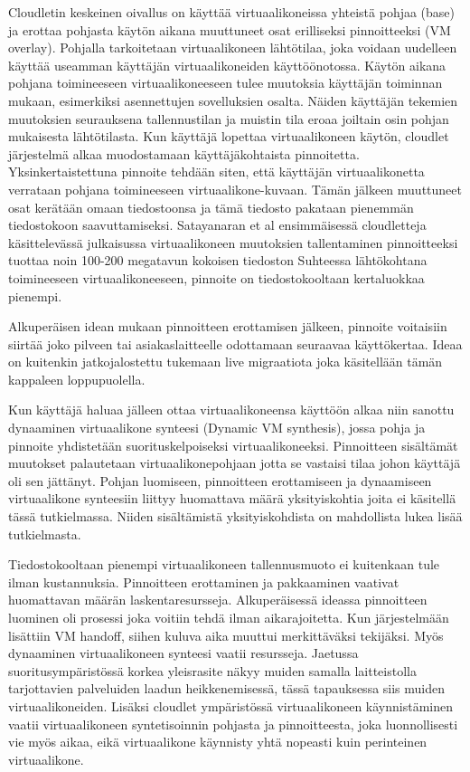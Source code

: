 Cloudletin keskeinen oivallus on käyttää virtuaalikoneissa yhteistä pohjaa (base) ja erottaa pohjasta käytön aikana muuttuneet osat erilliseksi pinnoitteeksi (VM overlay).
Pohjalla tarkoitetaan virtuaalikoneen lähtötilaa, joka voidaan uudelleen käyttää useamman käyttäjän virtuaalikoneiden käyttöönotossa.
Käytön aikana pohjana toimineeseen virtuaalikoneeseen tulee muutoksia käyttäjän toiminnan mukaan, esimerkiksi asennettujen sovelluksien osalta. 
Näiden käyttäjän tekemien muutoksien seurauksena tallennustilan ja muistin tila eroaa joiltain osin pohjan mukaisesta lähtötilasta. 
Kun käyttäjä lopettaa virtuaalikoneen käytön, cloudlet järjestelmä alkaa muodostamaan käyttäjäkohtaista pinnoitetta. 
Yksinkertaistettuna pinnoite tehdään siten, että käyttäjän virtuaalikonetta verrataan pohjana toimineeseen virtuaalikone-kuvaan. Tämän jälkeen muuttuneet osat kerätään omaan tiedostoonsa ja tämä tiedosto pakataan pienemmän tiedostokoon saavuttamiseksi.
Satayanaran et al ensimmäisessä cloudletteja käsittelevässä julkaisussa \cite{satya09} virtuaalikoneen muutoksien tallentaminen pinnoitteeksi tuottaa noin 100-200 megatavun kokoisen tiedoston
Suhteessa lähtökohtana toimineeseen virtuaalikoneeseen, pinnoite on tiedostokooltaan kertaluokkaa pienempi. \cite{satya09}

Alkuperäisen idean mukaan pinnoitteen erottamisen jälkeen, pinnoite voitaisiin siirtää joko pilveen tai asiakaslaitteelle odottamaan seuraavaa käyttökertaa. Ideaa on kuitenkin jatkojalostettu tukemaan live migraatiota joka käsitellään tämän kappaleen loppupuolella.

Kun käyttäjä haluaa jälleen ottaa virtuaalikoneensa käyttöön alkaa niin sanottu dynaaminen virtuaalikone synteesi (Dynamic VM synthesis), jossa pohja ja pinnoite yhdistetään suorituskelpoiseksi virtuaalikoneeksi.
Pinnoitteen sisältämät muutokset palautetaan virtuaalikonepohjaan jotta se vastaisi tilaa johon käyttäjä oli sen jättänyt. Pohjan luomiseen, pinnoitteen erottamiseen ja dynaamiseen virtuaalikone synteesiin liittyy huomattava määrä yksityiskohtia joita ei käsitellä tässä tutkielmassa. Niiden sisältämistä yksityiskohdista on mahdollista lukea lisää \cite{ha2013just} tutkielmasta. 

Tiedostokooltaan pienempi virtuaalikoneen tallennusmuoto ei kuitenkaan tule ilman kustannuksia. Pinnoitteen erottaminen ja pakkaaminen vaativat huomattavan määrän laskentaresursseja. Alkuperäisessä ideassa pinnoitteen luominen oli prosessi joka voitiin tehdä ilman aikarajoitetta. Kun järjestelmään lisättiin VM handoff, siihen kuluva aika muuttui merkittäväksi tekijäksi. Myös dynaaminen virtuaalikoneen synteesi vaatii resursseja. Jaetussa suoritusympäristössä korkea yleisrasite näkyy muiden samalla laitteistolla tarjottavien palveluiden laadun heikkenemisessä, tässä tapauksessa siis muiden virtuaalikoneiden.
Lisäksi cloudlet ympäristössä virtuaalikoneen käynnistäminen vaatii virtuaalikoneen syntetisoinnin pohjasta ja pinnoitteesta, joka luonnollisesti vie myös aikaa, eikä virtuaalikone käynnisty yhtä nopeasti kuin perinteinen virtuaalikone. 

